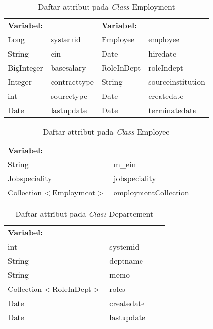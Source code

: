 \begin{table}[H]
	\caption{Daftar attribut pada \textit{Class} Employment}
	\centering
	\small
	\begin{adjustbox}{width=1\textwidth}	
		\begin{tabular}{|p{4cm} p{2.1cm} p{3cm} p{3.1cm}|}
			\hline
			\multicolumn{2}{|l}{\textbf{Variabel:}}&\multicolumn{2}{l|}{\textbf{Variabel:}}\\
			Long&systemid&Employee&employee\\
			String&ein&Date&hiredate\\
			BigInteger&basesalary&RoleInDept&roleIndept\\
			Integer&contracttype&String& sourceinstitution\\
			int&sourcetype&Date& createdate\\
			Date&lastupdate&Date& terminatedate\\
			\hline
		\end{tabular}
	\end{adjustbox}
\end{table}
\begin{table}[H]
	\caption{Daftar attribut pada \textit{Class} Employee}
	\centering
	\small
	\begin{adjustbox}{width=1\textwidth}	
		\begin{tabular}{|p{4cm} p{2.1cm} p{3cm} p{3.1cm}|}
			\hline
			\multicolumn{2}{|l}{\textbf{Variabel:}}&\multicolumn{2}{l|}{}\\
			String&m\_ein&&\\
			Jobspeciality&jobspeciality&&\\
			Collection$<$Employment$>$&employmentCollection&&\\
			\hline
		\end{tabular}
	\end{adjustbox}
\end{table}
\begin{table}[H]
	\caption{Daftar attribut pada \textit{Class} Departement}
	\centering
	\small
	\begin{adjustbox}{width=1\textwidth}	
		\begin{tabular}{|p{4cm} p{2.1cm} p{3cm} p{3.1cm}|}
			\hline
			\multicolumn{2}{|l}{\textbf{Variabel:}}&\multicolumn{2}{l|}{\textbf{}}\\
			int&systemid&&\\
			String&deptname&&\\
			String&memo&&\\
			Collection$<$RoleInDept$>$&roles&&\\
			Date&createdate&&\\
			Date&lastupdate&&\\
			\hline
		\end{tabular}
	\end{adjustbox}
\end{table}
